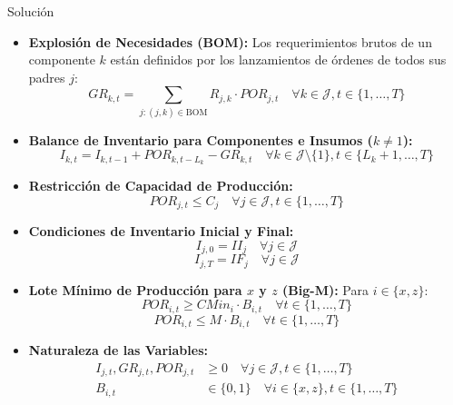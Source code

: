 \documentclass[11pt, a4paper]{article}
\begin{document}
\begin{ejercicio}{Solución}
\begin{itemize}
    \item \textbf{Explosión de Necesidades (BOM):}
    Los requerimientos brutos de un componente $k$ están definidos por los lanzamientos de órdenes de todos sus padres $j$:
    \begin{equation}
      GR_{k,t} = \sum_{j: (j,k) \in \text{BOM}} R_{j,k} \cdot POR_{j,t} \quad \forall k \in \mathcal{J}, t \in \{1, \dots, T\}
    \end{equation}

    \item \textbf{Balance de Inventario para Componentes e Insumos ($k \ne 1$):}
    \begin{equation}
      I_{k,t} = I_{k,t-1} + POR_{k,t-L_k} - GR_{k,t} \quad \forall k \in \mathcal{J} \setminus \{1\}, t \in \{L_k + 1, \dots, T\}
    \end{equation}

    \item \textbf{Restricción de Capacidad de Producción:}
    \begin{equation}
      POR_{j,t} \le C_j \quad \forall j \in \mathcal{J}, t \in \{1, \dots, T\}
    \end{equation}

    \item \textbf{Condiciones de Inventario Inicial y Final:}
    \begin{equation}
      I_{j,0} = II_j \quad \forall j \in \mathcal{J}
    \end{equation}
    \begin{equation}
      I_{j,T} = IF_j \quad \forall j \in \mathcal{J}
    \end{equation}

    \item \textbf{Lote Mínimo de Producción para $x$ y $z$ (Big-M):}
    Para $i \in \{x, z\}$:
    \begin{equation}
      POR_{i,t} \ge CMin_i \cdot B_{i,t} \quad \forall t \in \{1, \dots, T\}
    \end{equation}
    \begin{equation}
      POR_{i,t} \le M \cdot B_{i,t} \quad \forall t \in \{1, \dots, T\}
    \end{equation}

    \item \textbf{Naturaleza de las Variables:}
    \begin{align}
      I_{j,t}, GR_{j,t}, POR_{j,t} &\ge 0 \quad \forall j \in \mathcal{J}, t \in \{1, \dots, T\} \\
      B_{i,t} &\in \{0, 1\} \quad \forall i \in \{x, z\}, t \in \{1, \dots, T\}
    \end{align}
  \end{itemize}

\end{ejercicio}
\end{document}

